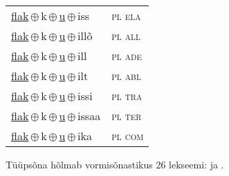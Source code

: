 \begin{minipage}{\textwidth}
\begin{sideways}
\begin{tabular}{l l}
\underline{flak}\,$\oplus$\,k\,$\oplus$\,\underline{u}\,$\oplus$\,iss & \textsc{ pl ela } \\
\underline{flak}\,$\oplus$\,k\,$\oplus$\,\underline{u}\,$\oplus$\,illõ & \textsc{ pl all } \\
\underline{flak}\,$\oplus$\,k\,$\oplus$\,\underline{u}\,$\oplus$\,ill & \textsc{ pl ade } \\
\underline{flak}\,$\oplus$\,k\,$\oplus$\,\underline{u}\,$\oplus$\,ilt & \textsc{ pl abl } \\
\underline{flak}\,$\oplus$\,k\,$\oplus$\,\underline{u}\,$\oplus$\,issi & \textsc{ pl tra } \\
\underline{flak}\,$\oplus$\,k\,$\oplus$\,\underline{u}\,$\oplus$\,issaa & \textsc{ pl ter } \\
\underline{flak}\,$\oplus$\,k\,$\oplus$\,\underline{u}\,$\oplus$\,ika & \textsc{ pl com } \\
\end{tabular}
\end{sideways}
\label{tab:tüüpsõnamall-flakku}

\end{minipage}

 
\vspace{1em}
\noindent Tüüpsõna hõlmab vormisõnastikus 26 lekseemi:  ja .
